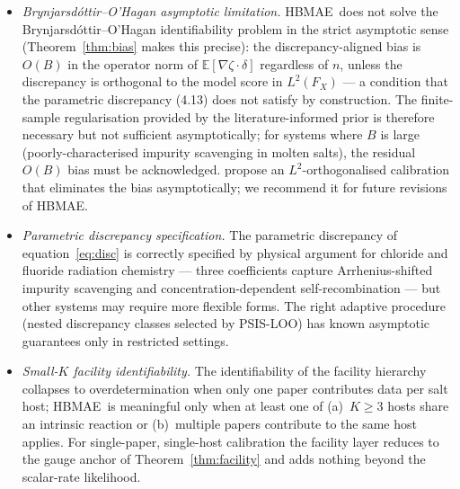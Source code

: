 \documentclass[12pt]{article}
\theoremstyle{plain}
\theoremstyle{definition}
\theoremstyle{remark}
\newcommand{\HBMAE}{HBMAE\xspace}
\newcommand{\E}{\mathbb{E}}
\begin{document}
\begin{itemize}
\item \textit{Brynjarsd\'ottir--O'Hagan asymptotic limitation.}
  \HBMAE\ does not solve the Brynjarsd\'ottir--O'Hagan identifiability
  problem in the strict asymptotic sense (Theorem~\ref{thm:bias} makes
  this precise): the discrepancy-aligned bias is $O(B)$ in the operator
  norm of $\E[\nabla\zeta\cdot\delta]$ regardless of $n$, unless the
  discrepancy is orthogonal to the model score in $L^2(F_X)$ --- a
  condition that the parametric discrepancy (4.13) does not satisfy by
  construction.  The finite-sample regularisation provided by the
  literature-informed prior is therefore necessary but not sufficient
  asymptotically; for systems where $B$ is large (poorly-characterised
  impurity scavenging in molten salts), the residual $O(B)$ bias must
  be acknowledged.  \citet{TuoWu2015,TuoWu2016} propose an
  $L^2$-orthogonalised calibration that eliminates the bias
  asymptotically; we recommend it for future revisions of \HBMAE.
\item \textit{Parametric discrepancy specification.}
  The parametric discrepancy of equation~\eqref{eq:disc} is correctly
  specified by physical argument for chloride and fluoride radiation
  chemistry --- three coefficients capture Arrhenius-shifted impurity
  scavenging and concentration-dependent self-recombination --- but
  other systems may require more flexible forms.  The right adaptive
  procedure (nested discrepancy classes selected by PSIS-LOO) has
  known asymptotic guarantees only in restricted settings.
\item \textit{Small-$K$ facility identifiability.}
  The identifiability of the facility hierarchy collapses to
  overdetermination when only one paper contributes data per salt host;
  \HBMAE\ is meaningful only when at least one of (a)~$K\ge 3$ hosts
  share an intrinsic reaction or (b)~multiple papers contribute to the
  same host applies.  For single-paper, single-host calibration the
  facility layer reduces to the gauge anchor of
  Theorem~\ref{thm:facility} and adds nothing beyond the
  scalar-rate likelihood.
\end{itemize}
\end{document}
